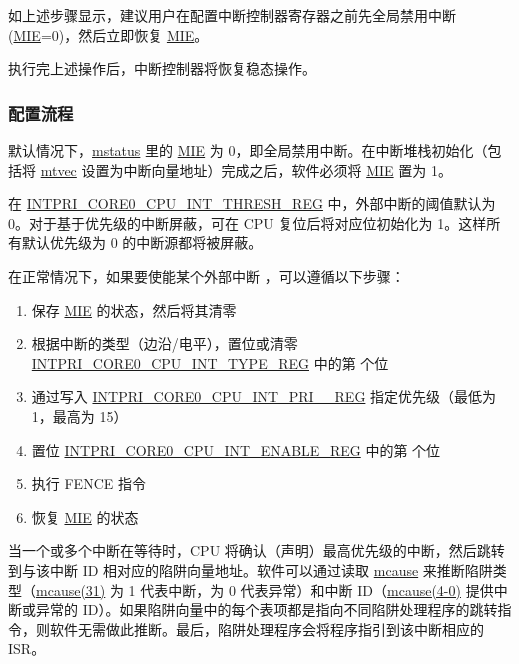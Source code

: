 \documentclass[main\_\_CN.tex]{subfiles}
\begin{document}
如上述步骤显示，建议用户在配置中断控制器寄存器之前先全局禁用中断 (\hyperref[fielddesc:MSTATUSMIE]{MIE}=0)，然后立即恢复 \hyperref[fielddesc:MSTATUSMIE]{MIE}。

执行完上述操作后，中断控制器将恢复稳态操作。

\subsubsection{配置流程}
\label{sec:riscvcpu-int-config}

默认情况下，\hyperref[regdesc:MSTATUS]{mstatus} 里的 \hyperref[fielddesc:MSTATUSMIE]{MIE} 为 0，即全局禁用中断。在中断堆栈初始化（包括将 \hyperref[regdesc:MTVEC]{mtvec} 设置为中断向量地址）完成之后，软件必须将 \hyperref[fielddesc:MSTATUSMIE]{MIE} 置为 1。

在 \hyperref[regdesc:INTPRICORE0CPUINTTHRESHREG]{INTPRI\_CORE0\_CPU\_INT\_THRESH\_REG} 中，外部中断的阈值默认为 0。对于基于优先级的中断屏蔽，可在 CPU 复位后将对应位初始化为 1。这样所有默认优先级为 0 的中断源都将被屏蔽。

在正常情况下，如果要使能某个外部中断 ，可以遵循以下步骤：
\begin{enumerate}
    \item 保存 \hyperref[fielddesc:MSTATUSMIE]{MIE} 的状态，然后将其清零
    \item 根据中断的类型（边沿/电平），置位或清零 \hyperref[regdesc:INTPRICORE0CPUINTTYPEREG]{INTPRI\_CORE0\_CPU\_INT\_TYPE\_REG} 中的第  个位
    \item 通过写入 \hyperref[regdesc:INTPRICORE0CPUINTPRINREG]{INTPRI\_CORE0\_CPU\_INT\_PRI\_\_REG} 指定优先级（最低为 1，最高为 15）
    \item 置位 \hyperref[regdesc:INTPRICORE0CPUINTENABLEREG]{INTPRI\_CORE0\_CPU\_INT\_ENABLE\_REG} 中的第  个位
    \item 执行 FENCE 指令
    \item 恢复 \hyperref[fielddesc:MSTATUSMIE]{MIE} 的状态
\end{enumerate}

当一个或多个中断在等待时，CPU 将确认（声明）最高优先级的中断，然后跳转到与该中断 ID 相对应的陷阱向量地址。软件可以通过读取 \hyperref[regdesc:MCAUSE]{mcause} 来推断陷阱类型（\hyperref[fielddesc:MCAUSEINT]{mcause(31)} 为 1 代表中断，为 0 代表异常）和中断 ID（\hyperref[fielddesc:MCAUSECODE]{mcause(4-0)} 提供中断或异常的 ID）。如果陷阱向量中的每个表项都是指向不同陷阱处理程序的跳转指令，则软件无需做此推断。最后，陷阱处理程序会将程序指引到该中断相应的 ISR。
\end{document}
